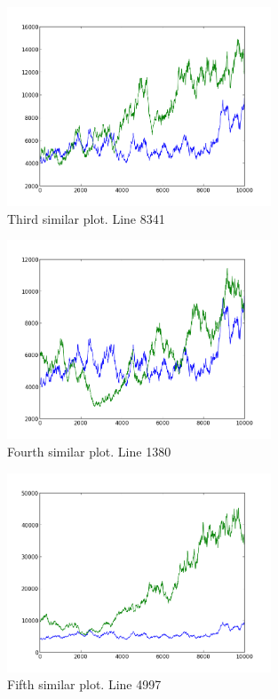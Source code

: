 \begin{figure}[h!]
    \centering
    \includegraphics[width=0.7\textwidth]{images/8341.png}
    \caption{Third similar plot.  Line 8341}
    \label{fig:ex1_3}
\end{figure}

\begin{figure}[h!]
    \centering
    \includegraphics[width=0.7\textwidth]{images/1380.png}
    \caption{Fourth similar plot.  Line 1380}
    \label{fig:ex1_4}
\end{figure}

\begin{figure}[h!]
    \centering
    \includegraphics[width=0.7\textwidth]{images/4997.png}
    \caption{Fifth similar plot.  Line 4997}
    \label{fig:ex1_5}
\end{figure}

